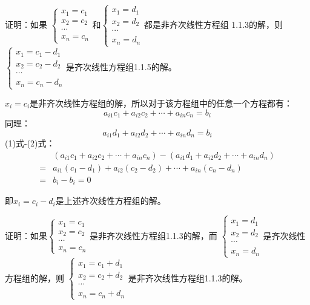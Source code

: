\documentclass[a4paper]{report}
\begin{document}
\EX 证明：如果
$
\begin{cases}
x_1=c_1\\
x_2=c_2\\
\cdots\\
x_n = c_n
\end{cases}
$和$
\begin{cases}
x_1=d_1\\
x_2=d_2\\
\cdots\\
x_n = d_n
\end{cases}
$都是非齐次线性方程组
1.1.3的解，则$
\begin{cases}
x_1=c_1-d_1\\
x_2=c_2-d_2\\
\cdots\\
x_n =c_n-d_n
\end{cases}$是齐次线性方程组1.1.5的解。

\begin{zhengming}
$x_i = c_i$是非齐次线性方程组的解，所以对于该方程组中的任意一个方程都有：
\begin{equation*}
a_{i1}c_{1}+a_{i2}c_{2}+\cdots+a_{in}c_{n}=b_i\tag{1}
\end{equation*}
同理：
\begin{equation*}
a_{i1}d_{1}+a_{i2}d_{2}+\cdots+a_{in}d_{n}=b_i\tag{2}
\end{equation*}
(1)式-(2)式：
\begin{align*}
&(a_{i1}c_{1}+a_{i2}c_{2}+\cdots+a_{in}c_{n})-(a_{i1}d_{1}+a_{i2}d_{2}+\cdots+a_{in}d_{n})\\
=&a_{i1}(c_{1}-d_{1})+a_{i2}(c_{2}-d_{2})+\cdots+a_{in}(c_{n}-d_{n})\\
=&b_i - b_i =0
\end{align*}

即$x_i=c_i-d_i$是上述齐次线性方程组的解。
\end{zhengming}

\EX 证明：如果$
\begin{cases}
x_1=c_1\\
x_2=c_2\\
\cdots\\
x_n = c_n
\end{cases}
$是非齐次线性方程组1.1.3的解，而
$
\begin{cases}
x_1=d_1\\
x_2=d_2\\
\cdots\\
x_n = d_n
\end{cases}
$是齐次线性方程组的解，则
$
\begin{cases}
x_1=c_1+d_1\\
x_2=c_2+d_2\\
\cdots\\
x_n =c_n+d_n
\end{cases}$是非齐次线性方程组1.1.3的解。
\end{document}
